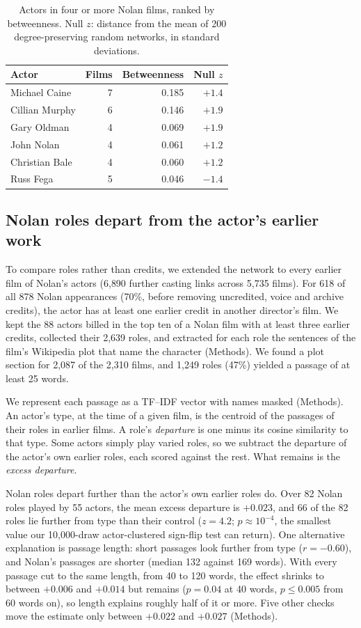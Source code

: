 \documentclass[9pt,twocolumn,twoside]{pnas-new}
\begin{document}
\begin{table}[h!]
\centering
\caption{Actors in four or more Nolan films, ranked by betweenness. Null $z$: distance from the mean of 200 degree-preserving random networks, in standard deviations.}
\begin{tabular}{@{}lrrr@{}}
\hline
Actor & Films & Betweenness & Null $z$ \\
\hline
Michael Caine & 7 & 0.185 & $+1.4$ \\
Cillian Murphy & 6 & 0.146 & $+1.9$ \\
Gary Oldman & 4 & 0.069 & $+1.9$ \\
John Nolan & 4 & 0.061 & $+1.2$ \\
Christian Bale & 4 & 0.060 & $+1.2$ \\
Russ Fega & 5 & 0.046 & $-1.4$ \\
\hline
\end{tabular}
\label{tab:casting-betweenness}
\end{table}

\subsection*{Nolan roles depart from the actor's earlier work}
To compare roles rather than credits, we extended the network to every earlier film of Nolan's actors (6{,}890 further casting links across 5{,}735 films). For 618 of all 878 Nolan appearances (70\%, before removing uncredited, voice and archive credits), the actor has at least one earlier credit in another director's film. We kept the 88 actors billed in the top ten of a Nolan film with at least three earlier credits, collected their 2{,}639 roles, and extracted for each role the sentences of the film's Wikipedia plot that name the character (Methods). We found a plot section for 2{,}087 of the 2{,}310 films, and 1{,}249 roles (47\%) yielded a passage of at least 25 words.

We represent each passage as a TF--IDF vector \cite{salton1988} with names masked (Methods). An actor's type, at the time of a given film, is the centroid of the passages of their roles in earlier films. A role's \emph{departure} is one minus its cosine similarity to that type. Some actors simply play varied roles, so we subtract the departure of the actor's own earlier roles, each scored against the rest. What remains is the \emph{excess departure}.

Nolan roles depart further than the actor's own earlier roles do. Over 82 Nolan roles played by 55 actors, the mean excess departure is $+0.023$, and 66 of the 82 roles lie further from type than their control ($z = 4.2$; $p \approx 10^{-4}$, the smallest value our 10{,}000-draw actor-clustered sign-flip test can return). One alternative explanation is passage length: short passages look further from type ($r = -0.60$), and Nolan's passages are shorter (median 132 against 169 words). With every passage cut to the same length, from 40 to 120 words, the effect shrinks to between $+0.006$ and $+0.014$ but remains ($p = 0.04$ at 40 words, $p \leq 0.005$ from 60 words on), so length explains roughly half of it or more. Five other checks move the estimate only between $+0.022$ and $+0.027$ (Methods).
\end{document}
